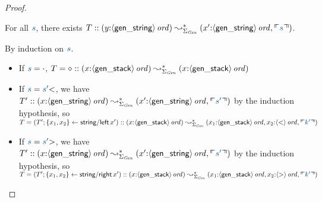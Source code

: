 \begin{proof}
\begin{lemma} For all $\obj{s}$, there exists
$T :: ({y{:}\istrue{\susp{\sf gen\_string}}}) \leadsto^*_{\Sigma_{\it Gen}} 
({x'{:}\istrue{\susp{\sf gen\_string}}, \ctxinterp{s}})$.
\end{lemma}
\noindent
By induction on $\obj{s}$.
\begin{itemize}
\item If $\obj{s} = \cdot$, $T = \diamond ::
({x{:}{\langle {\sf gen\_stack} \rangle}\,{{\it ord}}}) \leadsto^*_{\Sigma_{\it Gen}} 
(x{:}{\langle {\sf gen\_stack} \rangle}\,{{\it ord}})$
\item If $\obj{s} = \obj{s'}{\sf <}$, we have 
$T' :: ({x{:}\istrue{\susp{\sf gen\_string}}}) \leadsto^*_{\Sigma_{\it Gen}} 
(x'{:}\istrue{\susp{\sf gen\_string}}, \ctxinterp{s'})$ by the induction
hypothesis, so $T = (T'; \trstep{x_1, x_2}{{\sf string/left}\,x'}) :: 
({x{:}\istrue{\susp{\sf gen\_stack}}}) \leadsto^*_{\Sigma_{\it Gen}} 
(x_1{:}\istrue{\susp{\sf gen\_stack}},
 x_2{:}\istrue{\susp{\sf <}},
\ctxinterp{k'})$
\item If $\obj{s} = \obj{s'}{\sf >}$, we have 
$T' :: ({x{:}\istrue{\susp{\sf gen\_string}}}) \leadsto^*_{\Sigma_{\it Gen}} 
(x'{:}\istrue{\susp{\sf gen\_string}}, \ctxinterp{s'})$ by the induction
hypothesis, so $T = (T'; \trstep{x_1, x_2}{{\sf string/right}\,x'}) :: 
({x{:}\istrue{\susp{\sf gen\_stack}}}) \leadsto^*_{\Sigma_{\it Gen}} 
(x_1{:}\istrue{\susp{\sf gen\_stack}},
 x_2{:}\istrue{\susp{\sf >}},
\ctxinterp{k'})$
\end{itemize}


\end{proof}

